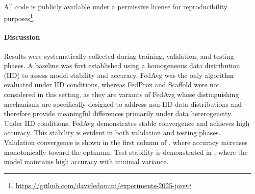All code is publicly available under a permissive license for
 reproducibility purposes\footnote{\url{https://github.com/davidedomini/experiments-2025-jors}}.

\paragraph{Discussion}
Results were systematically collected during training, validation, and testing phases.
A baseline was first established using a homogeneous data distribution (IID) to assess model stability and accuracy. 
%
FedAvg was the only algorithm evaluated under IID conditions, 
 whereas FedProx and Scaffold were not considered in this setting, 
 as they are variants of FedAvg whose distinguishing mechanisms are specifically 
 designed to address non-IID data distributions and therefore provide meaningful 
 differences primarily under data heterogeneity.
%
Under IID conditions, FedAvg demonstrates stable convergence and achieves high accuracy.
% 
This stability is evident in both validation and testing phases.
%
Validation convergence is shown in the first column of , 
 where accuracy increases monotonically toward the optimum. 
%
Test stability is demonstrated in , 
 where the model maintains high accuracy with minimal variance.

